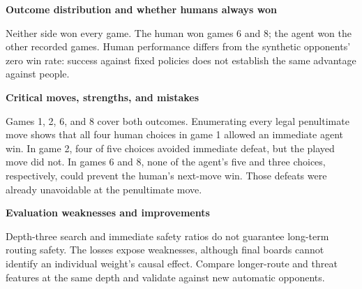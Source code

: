 \noindent\textbf{Outcome distribution and whether humans always won}\par\noindent Neither side won every game. The human won games 6 and 8; the agent won the other recorded games. Human performance differs from the synthetic opponents' zero win rate: success against fixed policies does not establish the same advantage against people.\par\medskip

\noindent\textbf{Critical moves, strengths, and mistakes}\par\noindent Games 1, 2, 6, and 8 cover both outcomes. Enumerating every legal penultimate move shows that all four human choices in game 1 allowed an immediate agent win. In game 2, four of five choices avoided immediate defeat, but the played move did not. In games 6 and 8, none of the agent's five and three choices, respectively, could prevent the human's next-move win. Those defeats were already unavoidable at the penultimate move.\par\medskip

\noindent\textbf{Evaluation weaknesses and improvements}\par\noindent Depth-three search and immediate safety ratios do not guarantee long-term routing safety. The losses expose weaknesses, although final boards cannot identify an individual weight's causal effect. Compare longer-route and threat features at the same depth and validate against new automatic opponents.\par\medskip
